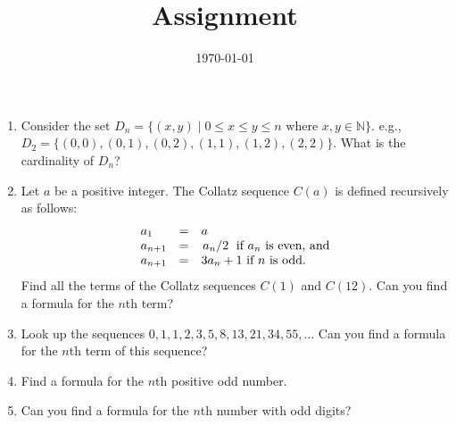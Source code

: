 \documentclass[12pt]{amsart}
\title{Assignment}
\date{\today}
\begin{document}
\maketitle
\begin{enumerate}
\item Consider the set $D_n = \{(x,y) \mid 0 \leq x \leq y \leq n \text{ where } x, y \in \mathbb{N}\}$. e.g., $D_2 =  \{ (0,0), (0,1), (0,2), (1,1), (1,2), (2,2)\}$. What is the cardinality of $D_n$?
\item Let $a$ be a positive integer. The Collatz sequence $C(a)$ is defined recursively as follows:
\begin{equation*}
  \begin{array}{lcl}
    a_1 &=& a \\
    a_{n+1}&=&\flatfrac{a_n}{2} \text { if } a_n \text{ is even, and}\\
    a_{n+1}&=&3a_n+1 \text{ if } n \text{ is odd.}
  \end{array}
\end{equation*}
Find all the terms of the Collatz sequences $C(1)$ and $C(12)$. Can you find a formula for the $n$th term?

\item Look up the sequences $0, 1, 1, 2, 3, 5, 8, 13, 21, 34, 55,\ldots$ Can you find a formula for the $n$th term of this sequence?
\item Find a formula for the $n$th positive odd number.
\item Can you find a formula for the $n$th number with odd digits?
\end{enumerate}
\end{document}
